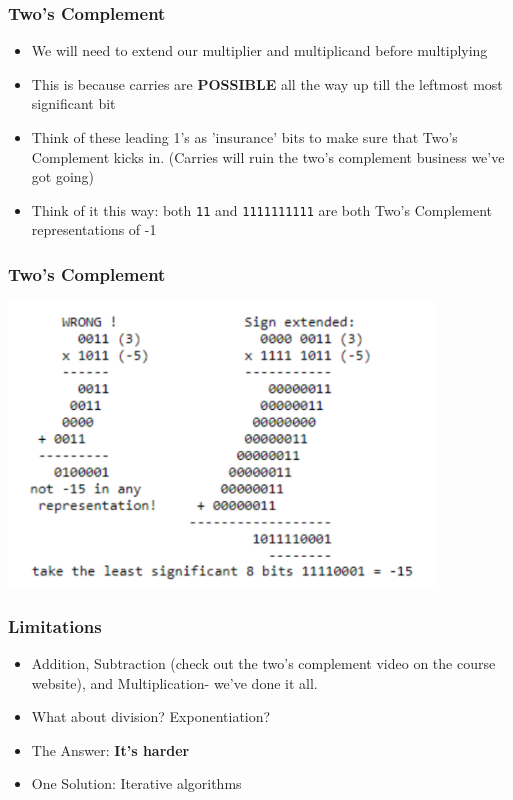 \documentclass{beamer}
\begin{document}
    	\begin{frame}
    		\frametitle{Two's Complement}
    		\begin{itemize}
    			\item We will need to extend our multiplier and multiplicand before multiplying
    			\item This is because carries are \textbf{POSSIBLE} all the way up till the leftmost most significant bit
    			\item Think of these leading 1's as 'insurance' bits to make sure that Two's Complement kicks in. (Carries will ruin the two's complement business we've got going)
    			\item Think of it this way: both \texttt{11} and \texttt{1111111111} are both Two's Complement representations of -1
    		\end{itemize}
    	\end{frame}
    	
    	\begin{frame}
    		\frametitle{Two's Complement}
    		\centering
    		\includegraphics[width=0.85\textwidth]{multiplier}
    	\end{frame}    	   	
    	
    	
    	\begin{frame}
    		\frametitle{Limitations}
    		\begin{itemize}
    			\item Addition, Subtraction (check out the two's complement video on the course website), and Multiplication- we've done it all.
    			\item What about division? Exponentiation?
    			\item The Answer: \textbf{It's harder}
    			\item One Solution: Iterative algorithms
    		\end{itemize}
    	\end{frame}
    	
\end{document}
